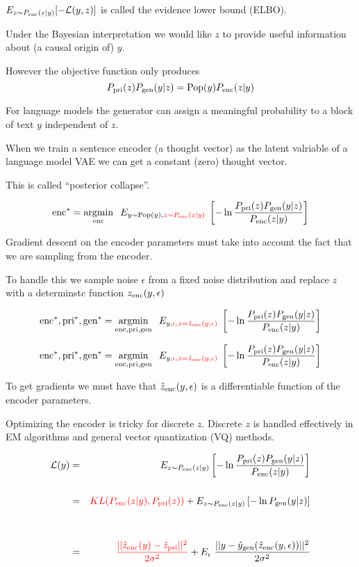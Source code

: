 {\vfill
{\color{red} $E_{z\sim P_{\mathrm{enc}}(z|y)}[-{\cal L}(y,z)]$} is called {\color{red} the evidence lower bound (ELBO)}.


Under the Bayesian interpretation we would like $z$ to provide useful information about (a causal origin of) $y$.

\vfill
However the objective function only produces
$$P_{\mathrm{pri}}(z)P_{\mathrm{gen}}(y|z) = \mathrm{Pop}(y)P_{\mathrm{enc}}(z|y)$$

\vfill
For language models the generator can assign a meaningful probability to a block of text $y$ independent of $z$.

\vfill
When we train a sentence encoder (a thought vector) as the latent valriable of a language model VAE we can get a constant (zero) thought vector.

\vfill
This is called ``posterior collapse''.


$$\mathrm{enc}^* = \operatorname*{argmin}_{\mathrm{enc}}\;\;E_{y\sim \mathrm{Pop}(y),{\color{red} z\sim P_{\mathrm{enc}}(z|y)}}\;\left[- \ln \frac{P_{\mathrm{pri}}(z)P_{\mathrm{gen}}(y|z)}{P_{\mathrm{enc}}(z|y)}\right]$$

\vfill
Gradient descent on the encoder parameters must take into account the fact that we are sampling from the encoder.

\vfill
To handle this we sample noise $\epsilon$ from a fixed noise distribution and replace $z$ with a determinstc function $z_{\mathrm{enc}}(y,\epsilon)$

\vfill
$$\mathrm{enc}^*,\mathrm{pri}^*,\mathrm{gen}^* = \operatorname*{argmin}_{\mathrm{enc},\mathrm{pri},\mathrm{gen}}\;\;E_{y,{\color{red} \epsilon,z=\hat{z}_{\mathrm{enc}}(y,\epsilon)}}\;\left[- \ln \frac{P_{\mathrm{pri}}(z)P_{\mathrm{gen}}(y|z)}{P_{\mathrm{enc}}(z|y)}\right]$$


$$\mathrm{enc}^*,\mathrm{pri}^*,\mathrm{gen}^* = \operatorname*{argmin}_{\mathrm{enc},\mathrm{pri},\mathrm{gen}}\;\;E_{y,{\color{red} \epsilon,z=\hat{z}_{\mathrm{enc}}(y,\epsilon)}}\;\left[- \ln \frac{P_{\mathrm{pri}}(z)P_{\mathrm{gen}}(y|z)}{P_{\mathrm{enc}}(z|y)}\right]$$

\vfill
To get gradients we must have that $\hat{z}_{\mathrm{enc}}(y,\epsilon)$ is a differentiable function of the encoder parameters.

\vfill
Optimizing the encoder is tricky for discrete $z$.  Discrete $z$ is handled effectively in EM algorithms and general vector quantization (VQ) methods.

\vfill
\begin{eqnarray*}
{\cal L}(y) & = & E_{z \sim P_{\mathrm{enc}}(z|y)}\left[ - \ln \frac{P_{\mathrm{pri}}(z)P_{\mathrm{gen}}(y|z)}{P_{\mathrm{enc}}(z|y)}\right] \\
\\
& = & {\color{red} KL(P_{\mathrm{enc}}(z|y),P_{\mathrm{pri}}(z))} + E_{z \sim P_{\mathrm{enc}}(z|y)}\left[- \ln P_{\mathrm{gen}}(y|z)\right] \\
\\
\\
&=& {\color{red} \frac{||\hat{z}_{\mathrm{enc}}(y) - \hat{z}_{\mathrm{pri}}||^2}{2\sigma^2}} + E_\epsilon\;\frac{||y - \hat{y}_{\mathrm{gen}}(\hat{z}_{\mathrm{enc}}(y,\epsilon))||^2}{2\sigma^2}
\end{eqnarray*}

}
